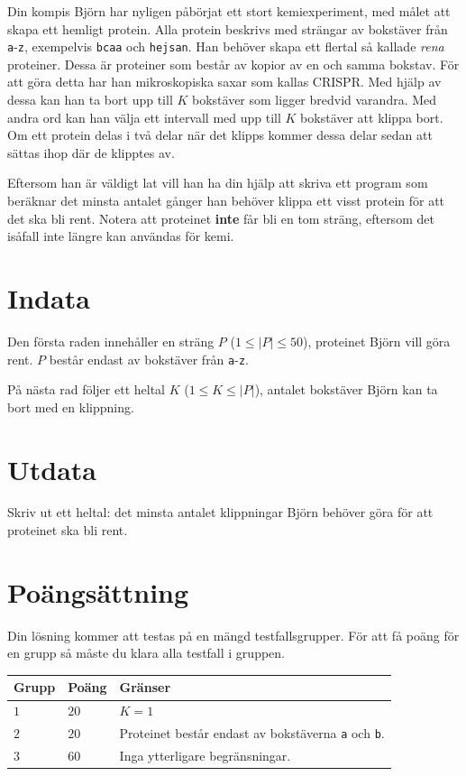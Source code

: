 \noindent

Din kompis Björn har nyligen påbörjat ett stort kemiexperiment, med målet att skapa
ett hemligt protein. Alla protein beskrivs med strängar av bokstäver från
\texttt{a}-\texttt{z}, exempelvis \texttt{bcaa} och \texttt{hejsan}. Han behöver skapa
ett flertal så kallade \textit{rena} proteiner. Dessa är proteiner som består av kopior
av en och samma bokstav. För att göra detta har han mikroskopiska saxar som kallas CRISPR.
Med hjälp av dessa kan han ta bort upp till $K$ bokstäver som ligger bredvid varandra.
Med andra ord kan han välja ett intervall med upp till $K$ bokstäver att klippa bort.
Om ett protein delas i två delar när det klipps kommer dessa delar sedan att sättas ihop där de klipptes av. 

Eftersom han är väldigt lat vill han ha din hjälp att skriva ett program som beräknar
det minsta antalet gånger han behöver klippa ett visst protein för att det ska bli rent.
Notera att proteinet \textbf{inte} får bli en tom sträng, eftersom det isåfall inte
längre kan användas för kemi.


\section*{Indata}
Den första raden innehåller en sträng $P$ ($1 \leq |P| \leq 50$), proteinet Björn vill göra rent.
$P$ består endast av bokstäver från \texttt{a}-\texttt{z}.

På nästa rad följer ett heltal $K$ ($1 \leq K \leq |P|$), antalet bokstäver Björn kan ta bort med en klippning. 

\section*{Utdata}
Skriv ut ett heltal: det minsta antalet klippningar Björn behöver göra för att proteinet ska bli rent.


\section*{Poängsättning}
Din lösning kommer att testas på en mängd testfallsgrupper.
För att få poäng för en grupp så måste du klara alla testfall i gruppen.

\noindent
\begin{tabular}{| l | l | p{12cm} |}
  \hline
  \textbf{Grupp} & \textbf{Poäng} & \textbf{Gränser} \\ \hline
  $1$    & $20$       & $K = 1$ \\ \hline
  $2$    & $20$       & Proteinet består endast av bokstäverna \texttt{a} och \texttt{b}. \\ \hline
  $3$    & $60$       & Inga ytterligare begränsningar. \\ \hline
\end{tabular}

